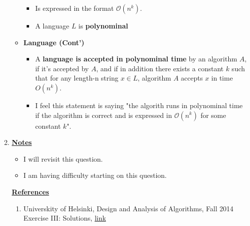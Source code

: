 \documentclass[12pt]{article}
\begin{document}
\begin{enumerate}[1.]
\begin{itemize}
        \begin{itemize}
            \item Is expressed in the format $\mathcal{O}(n^k)$.
            \item A language $L$ is \textbf{polynominal}
        \end{itemize}

        \item \textbf{Language (Cont')}

        \begin{itemize}
            \item A \textbf{language is accepted in polynominal time} by an algorithm $A$,
            if it's accepted by $A$, and if in addition there exists a constant $k$ such that
            for any length-n string $x \in L$, algorithm $A$ accepts $x$ in time $O(n^k)$.
            \item I feel this statement is saying "the algorith runs in polynominal time if the algorithm is correct and is expressed in $\mathcal{O}(n^k)$ for some constant $k$".
        \end{itemize}
    \end{itemize}

    \item

    \bigskip

    \underline{\textbf{Notes}}

    \begin{itemize}
        \item I will revisit this question.
        \item I am having difficulty starting on this question.
    \end{itemize}

    \underline{\textbf{References}}

    \begin{enumerate}[1)]
        \item Universkity of Helsinki, Design and Analysis of Algorithms, Fall 2014 Exercise III: Solutions, \href{https://www.cs.helsinki.fi/webfm_send/1461}{link}
    \end{enumerate}

\end{enumerate}
\end{document}
